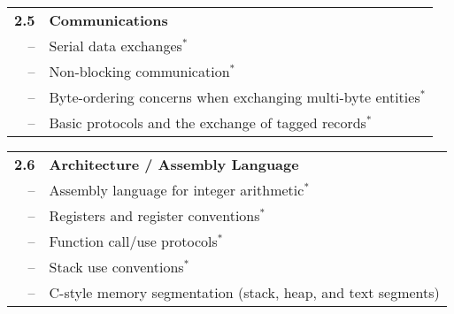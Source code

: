 \noindent
\begin{tabular}{r l}
{\bf 2.5} & {\bf Communications} \\
-- & Serial data exchanges$^*$ \\
-- & Non-blocking communication$^*$ \\
-- & Byte-ordering concerns when exchanging multi-byte entities$^*$ \\
-- & Basic protocols and the exchange of tagged records$^*$
\end{tabular}

\noindent
\begin{tabular}{r l}
{\bf 2.6} & {\bf Architecture / Assembly Language} \\
-- & Assembly language for integer arithmetic$^*$ \\
-- & Registers and register conventions$^*$ \\
-- & Function call/use protocols$^*$ \\
-- & Stack use conventions$^*$ \\
-- & C-style memory segmentation (stack, heap, and text segments)
\end{tabular}
